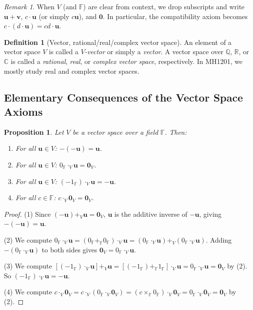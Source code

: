 \documentclass[11pt, a4paper, notitlepage]{report}
\newtheorem{proposition}[theorem]{Proposition}
\theoremstyle{definition}
\newtheorem{definition}[theorem]{Definition}
\theoremstyle{remark}
\newtheorem{remark}[theorem]{Remark}
\begin{document}
\begin{remark}
When $V$ (and $\mathbb{F}$) are clear from context, we drop subscripts and write $\mathbf{u} + \mathbf{v}$, $c \cdot \mathbf{u}$ (or simply $c\mathbf{u}$), and $\mathbf{0}$. In particular, the compatibility axiom becomes $c \cdot (d \cdot \mathbf{u}) = cd \cdot \mathbf{u}$.
\end{remark}

\begin{definition}[Vector, rational/real/complex vector space]\label{def:vector}
An element of a vector space $V$ is called a \emph{$V$-vector} or simply a \emph{vector}. A vector space over $\mathbb{Q}$, $\mathbb{R}$, or $\mathbb{C}$ is called a \emph{rational}, \emph{real}, or \emph{complex vector space}, respectively. In MH1201, we mostly study real and complex vector spaces.
\end{definition}

\subsection{Elementary Consequences of the Vector Space Axioms}

\begin{proposition}\label{prop:vs-consequences}
Let $V$ be a vector space over a field $\mathbb{F}$. Then:
\begin{enumerate}
  \item For all $\mathbf{u} \in V$: $-(-\mathbf{u}) = \mathbf{u}$.
  \item For all $\mathbf{u} \in V$: $0_\mathbb{F} \cdot_V \mathbf{u} = \mathbf{0}_V$.
  \item For all $\mathbf{u} \in V$: $(-1_\mathbb{F}) \cdot_V \mathbf{u} = -\mathbf{u}$.
  \item For all $c \in \mathbb{F}$: $c \cdot_V \mathbf{0}_V = \mathbf{0}_V$.
\end{enumerate}
\end{proposition}

\begin{proof}
(1) Since $(-\mathbf{u}) +_V \mathbf{u} = \mathbf{0}_V$, $\mathbf{u}$ is the additive inverse of $-\mathbf{u}$, giving $-(-\mathbf{u}) = \mathbf{u}$.

(2) We compute $0_\mathbb{F} \cdot_V \mathbf{u} = (0_\mathbb{F} +_\mathbb{F} 0_\mathbb{F}) \cdot_V \mathbf{u} = (0_\mathbb{F} \cdot_V \mathbf{u}) +_V (0_\mathbb{F} \cdot_V \mathbf{u})$. Adding $-(0_\mathbb{F} \cdot_V \mathbf{u})$ to both sides gives $\mathbf{0}_V = 0_\mathbb{F} \cdot_V \mathbf{u}$.

(3) We compute $[(-1_\mathbb{F}) \cdot_V \mathbf{u}] +_V \mathbf{u} = [(-1_\mathbb{F}) +_\mathbb{F} 1_\mathbb{F}] \cdot_V \mathbf{u} = 0_\mathbb{F} \cdot_V \mathbf{u} = \mathbf{0}_V$ by (2). So $(-1_\mathbb{F}) \cdot_V \mathbf{u} = -\mathbf{u}$.

(4) We compute $c \cdot_V \mathbf{0}_V = c \cdot_V (0_\mathbb{F} \cdot_V \mathbf{0}_V) = (c \times_\mathbb{F} 0_\mathbb{F}) \cdot_V \mathbf{0}_V = 0_\mathbb{F} \cdot_V \mathbf{0}_V = \mathbf{0}_V$ by (2).
\end{proof}
\end{document}

